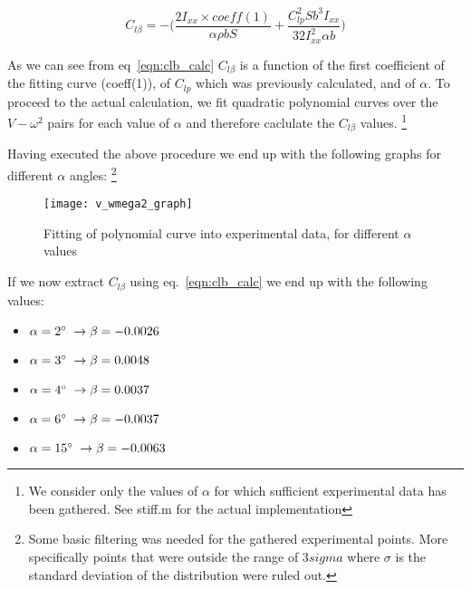 \begin{equation}
    C_{l\beta} = -\bigg(\frac{2I_{xx}\times coeff(1)}{\alpha \rho bS} + 
    \frac{C_{lp}^2Sb^3I_{xx}}{32I_{xx}^2\alpha b}\bigg)
    \label{eqn:clb_calc}
\end{equation}

As we can see from eq~\ref{eqn:clb_calc} $C_{l\beta}$ is a function of the 
first coefficient of the fitting curve (coeff(1)), of $C_{lp}$ which was previously
calculated, and of $\alpha$. To proceed to the actual calculation, 
we fit quadratic polynomial curves over the $V-\omega^2$ pairs for each value of $\alpha$
and therefore caclulate the $C_{l\beta}$ values.
\footnote{We consider only the values of $\alpha$ for which sufficient experimental data has been gathered.
See stiff.m for the actual implementation}

Having executed the above procedure we end up with the following graphs 
for different $\alpha$ angles:
\footnote{Some basic filtering was needed for the gathered experimental points. 
More specifically points that were outside the range of 3$sigma$ where $\sigma$
is the standard deviation of the distribution were ruled out.}

\begin{figure}[H]
    \begin{center}
        \texttt{[image: v\_wmega2\_graph]} %
    \end{center}
    \caption{Fitting of polynomial curve into experimental data, for different $\alpha$ values}
    \label{fig:v_wmega2_graph}
\end{figure}

If we now extract $C_{l\beta}$ using eq.~\ref{eqn:clb_calc} we end up with the 
following values:

\begin{itemize}
    \item $\alpha = 2\degree\; \rightarrow \beta  = -0.0026$
    \item $\alpha = 3\degree\; \rightarrow \beta  = 0.0048$
    \item $\alpha = 4\degree\; \rightarrow \beta  = 0.0037$
    \item $\alpha = 6\degree\; \rightarrow \beta  = -0.0037$
    \item $\alpha = 15\degree\; \rightarrow \beta  = -0.0063$
\end{itemize}

